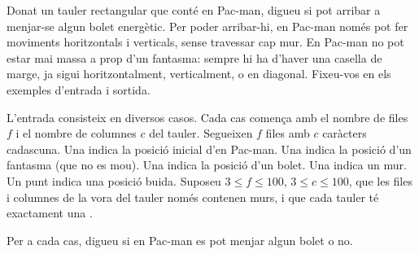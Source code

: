 

\Statement

Donat un tauler rectangular que conté en Pac-man,
digueu si pot arribar a menjar-se algun bolet energètic.
Per poder arribar-hi,
en Pac-man només pot fer moviments horitzontals i verticals,
sense travessar cap mur.
En Pac-man no pot estar mai massa a prop d'un fantasma:
sempre hi ha d'haver una casella de marge,
ja sigui horitzontalment, verticalment, o en diagonal.
Fixeu-vos en els exemples d'entrada i sortida.


\Input

L'entrada consisteix en diversos casos.
Cada cas comença amb el nombre de files $f$
i el nombre de columnes $c$ del tauler.
Segueixen $f$ files amb $c$ caràcters cadascuna.
Una  indica la posició inicial d'en Pac-man.
Una  indica la posició d'un fantasma (que no es mou).
Una  indica la posició d'un bolet.
Una  indica un mur.
Un punt indica una posició buida.
Suposeu $3 \le f \le 100$, $3 \le c \le 100$,
que les files i columnes de la vora del tauler només contenen murs,
i que cada tauler té exactament una .


\Output

Per a cada cas, digueu si en Pac-man es pot menjar algun bolet o no.


\Sample
